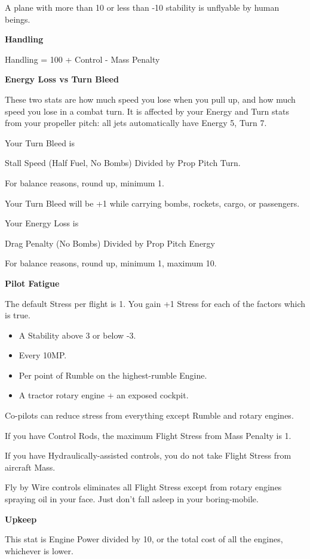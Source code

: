 \documentclass{article}
\begin{document}
A plane with more than 10 or less than -10 stability is unflyable
by human beings.

\textbf{Handling}

Handling = 100 + Control - Mass Penalty

\textbf{Energy Loss vs Turn Bleed}

These two stats are how much speed you lose when you pull up, and
how much speed you lose in a combat turn. It is affected by your Energy
and Turn stats from your propeller pitch: all jets automatically have
Energy 5, Turn 7.

Your Turn Bleed is

Stall Speed (Half Fuel, No Bombs) Divided by Prop Pitch Turn.

For balance reasons, round up, minimum 1.

Your Turn Bleed will be +1 while carrying bombs, rockets, cargo,
or passengers.

Your Energy Loss is

Drag Penalty (No Bombs) Divided by Prop Pitch Energy

For balance reasons, round up, minimum 1, maximum 10.

\textbf{Pilot Fatigue}

The default Stress per flight is 1. You gain +1 Stress for each
of the factors which is true.

\begin{itemize}
    \item A Stability above 3 or below -3.
    \item Every 10MP.
    \item Per point of Rumble on the highest-rumble Engine.
    \item A tractor rotary engine + an exposed cockpit.
\end{itemize}

Co-pilots can reduce stress from everything except Rumble and
rotary engines.

If you have Control Rods, the maximum Flight Stress from Mass
Penalty is 1.

If you have Hydraulically-assisted controls, you do not take
Flight Stress from aircraft Mass.

Fly by Wire controls eliminates all Flight Stress except from
rotary engines spraying oil in your face. Just don't fall asleep in your
boring-mobile.

\textbf{Upkeep}

This stat is Engine Power divided by 10, or the total cost of all
the engines, whichever is lower.
\end{document}
